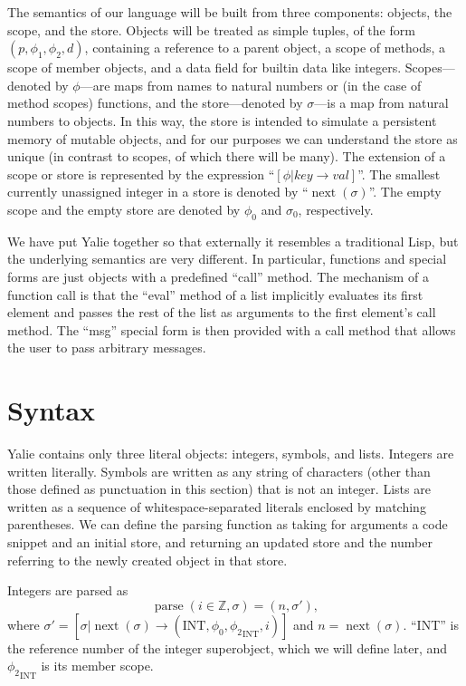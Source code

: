 \documentclass[twocolumn]{article}
\begin{document}
The semantics of our language will be built from three components:
objects, the scope, and the store. Objects will be treated as simple
tuples, of the form $(p,\phi_1,\phi_2,d)$, containing a reference to a
parent object, a scope of methods, a scope of member objects, and a
data field for builtin data like integers. Scopes---denoted by
$\phi$---are maps from names to natural numbers or (in the case of
method scopes) functions, and the store---denoted by $\sigma$---is a
map from natural numbers to objects. In this way, the store is
intended to simulate a persistent memory of mutable objects, and for
our purposes we can understand the store as unique (in contrast to
scopes, of which there will be many). The extension of a scope or
store is represented by the expression ``$[\phi|key\rightarrow
val]$''. The smallest currently unassigned integer in a store is
denoted by ``$\operatorname{next}(\sigma)$''. The empty scope and the
empty store are denoted by $\phi_0$ and $\sigma_0$, respectively.

We have put Yalie together so that externally it resembles a
traditional Lisp, but the underlying semantics are very different. In
particular, functions and special forms are just objects with a
predefined ``call'' method. The mechanism of a function call is that
the ``eval'' method of a list implicitly evaluates its first element
and passes the rest of the list as arguments to the first element's
call method. The ``msg'' special form is then provided with a call
method that allows the user to pass arbitrary messages.

\section*{Syntax}

Yalie contains only three literal objects: integers, symbols, and
lists. Integers are written literally. Symbols are written as any
string of characters (other than those defined as punctuation in this
section) that is not an integer. Lists are written as a sequence of
whitespace-separated literals enclosed by matching parentheses. We can
define the parsing function as taking for arguments a code snippet and
an initial store, and returning an updated store and the number
referring to the newly created object in that store.

Integers are parsed as
\[\operatorname{parse}(i\in\mathbb{Z},\sigma) = (n,\sigma'),\]
where $\sigma' = [\sigma|\operatorname{next}(\sigma) \rightarrow
(\text{INT}, {\phi_0}, {\phi_2}_{\text{INT}}, i)]$ and
$n=\operatorname{next}(\sigma)$. ``INT'' is the reference number of
the integer superobject, which we will define later, and
${\phi_2}_{\text{INT}}$ is its member scope.
\end{document}
